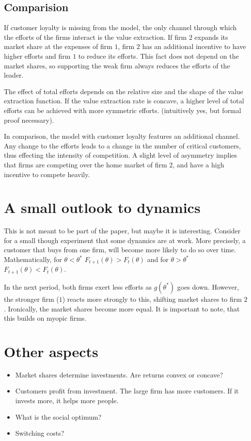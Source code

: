 \documentclass[a4paper, 11pt]{article}
\begin{document}
\subsection{Comparision}

If customer loyalty is missing from the model, the only channel through which the efforts of the firms interact is the value extraction. If firm $2$ expands its market share at the expenses of firm $1$, firm $2$ has an additional incentive to have higher efforts and firm $1$ to reduce its efforts. This fact does not depend on the market shares, so supporting the weak firm always reduces the efforts of the leader.

The effect of total efforts depends on the relative size and the shape of the value extraction function. If the value extraction rate is concave, a higher level of total efforts can be achieved with more symmetric efforts. (intuitively yes, but formal proof necessary).

In comparison, the model with customer loyalty features an additional channel. Any change to the efforts leads to a change in the number of critical customers, thus effecting the intensity of competition. A slight level of asymmetry implies that firms are competing over the home market of firm $2$, and have a high incentive to compete heavily. 

\section{A small outlook to dynamics}
This is not meant to be part of the paper, but maybe it is interesting. Consider for a small though experiment that some dynamics are at work. More precisely, a customer that buys from one firm, will become more likely to do so over time. Mathematically, for $\theta<\theta^*$ $F_{t+1}(\theta)>F_t(\theta)$ and for $\theta>\theta^*$ $F_{t+1}(\theta)<F_t(\theta)$.

In the next period, both firms exert less efforts as $g(\theta^*)$ goes down. However, the stronger firm ($1$) reacts more strongly to this, shifting market shares to firm $2$. Ironically, the market shares become more equal. It is important to note, that this builds on myopic firms.  
\section{Other aspects}
\begin{itemize}
	\item Market shares determine investments. Are returns convex or concave?
	\item Customers profit from investment. The large firm has more customers. If it invests more, it helps more people. 
	\item What is the social optimum?
	\item Switching costs?
\end{itemize}

 
\end{document}
